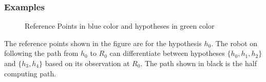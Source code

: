 \documentclass{beamer}
\begin{document}
\frame
{
  \frametitle{Examples}
\begin{figure}[h]
\begin{center}
\caption{\label{fig:Reference Points}Reference Points in blue color and hypotheses in green color}
\end{center}
\end{figure}

The reference points shown in the figure are for the hypothesis $h_0$. The robot on following the path from $h_0$ to $R_0$ 
can differentiate between hypotheses $\{h_0,h_1,h_2\}$ and $\{h_3, h_4\}$ based on its observation at $R_0$. The path shown in black is the half computing path.
}
\end{document}
